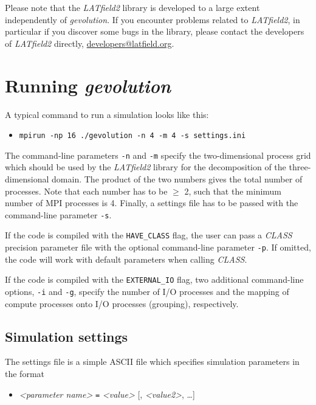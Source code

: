 \documentclass[a4paper,10pt]{article}
\begin{document}
Please note that the \textit{LATfield2} library is developed to a large extent independently of \textit{gevolution}. If you encounter problems related to \textit{LATfield2}, in particular if you discover some bugs in the library, please contact the developers of \textit{LATfield2} directly, \url{developers@latfield.org}.


\section{Running \textit{gevolution}}

A typical command to run a simulation looks like this:

\begin{itemize}
 \item[] \texttt{mpirun -np 16 ./gevolution -n 4 -m 4 -s settings.ini} 
\end{itemize}

\noindent The command-line parameters \texttt{-n} and \texttt{-m} specify the two-dimensional process grid which should be used by the 
\textit{LATfield2} library for the decomposition of the three-dimensional domain. The product of the two numbers gives the total number of 
processes. Note that each number has to be $\geq$ 2, such that the minimum number of MPI processes is 4. Finally, a settings file has to be 
passed with the command-line parameter \texttt{-s}.

If the code is compiled with the \texttt{HAVE\_CLASS} flag, the user can pass a \textit{CLASS} precision parameter file with the optional
command-line parameter \texttt{-p}. If omitted, the code will work with default parameters when calling \textit{CLASS}.

If the code is compiled with the \texttt{EXTERNAL\_IO} flag, two additional command-line options, \texttt{-i} and \texttt{-g}, specify the 
number of I/O processes and the mapping of compute processes onto I/O processes (grouping), respectively.

\subsection{Simulation settings}

The settings file is a simple ASCII file which specifies simulation parameters in the format

\begin{itemize}
 \item[] \textit{<parameter name>} \texttt{=} \textit{<value>} [, \textit{<value2>}, \ldots]
\end{itemize}
\end{document}
